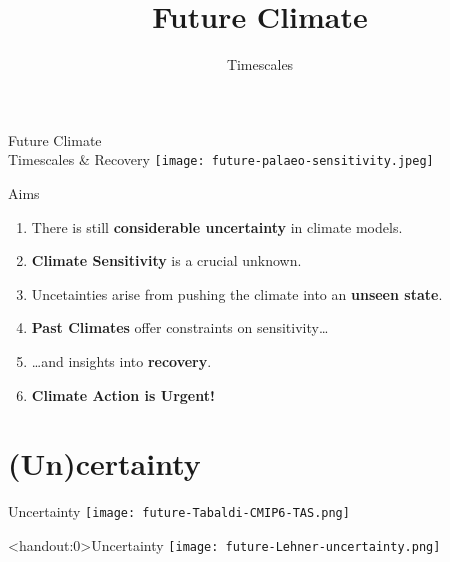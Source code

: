 \documentclass[aspectratio=169]{beamer}
\title{Future Climate}
\author{Timescales}
\begin{document}

\begin{frame}{Future Climate\\Timescales \& Recovery}
    \texttt{[image: future-palaeo-sensitivity.jpeg]}
\end{frame}

\begin{frame}{Aims}

    \begin{enumerate}
        \item There is still \textbf{considerable uncertainty} in climate models.
        \item \textbf{Climate Sensitivity} is a crucial unknown.
        \item Uncetainties arise from pushing the climate into an \textbf{unseen state}.
        \item \textbf{Past Climates} offer constraints on sensitivity\dots
        \item \dots and insights into \textbf{recovery}.
        \item \textbf{Climate Action is Urgent!}
    \end{enumerate}

\end{frame}

\section{(Un)certainty}

\begin{frame}{Uncertainty}
    \centering
    \texttt{[image: future-Tabaldi-CMIP6-TAS.png]}
\end{frame}

\begin{frame}<handout:0>{Uncertainty}
    \centering
    \texttt{[image: future-Lehner-uncertainty.png]}
\end{frame}
\end{document}
